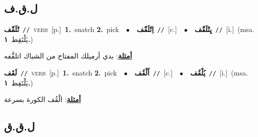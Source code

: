 \documentclass[10pt,a4paper,twoside]{article} %
\begin{document}
\begin{multicols}{2}
\vspace{-3mm}
\subsection*{\color{blue}\foreignlanguage{arabic}{ل.ق.ف}\color{blue}{}} 

{\setlength\topsep{0pt}\textbf{\foreignlanguage{arabic}{تْلَقّف}}\ {\color{gray}\texttt{//}\color{black}}\ \textsc{verb}\ [p.]\ \textbf{1.}~snatch  \textbf{2.}~pick\ \ $\bullet$\ \ \setlength\topsep{0pt}\textbf{\foreignlanguage{arabic}{اِتْلَقّف}}\ {\color{gray}\texttt{//}\color{black}}\ [c.]\ \ $\bullet$\ \ \setlength\topsep{0pt}\textbf{\foreignlanguage{arabic}{يِتْلَقّف}}\ {\color{gray}\texttt{//}\color{black}}\ [i.]\ \color{gray}(msa. \foreignlanguage{arabic}{يَلْتَقِط}~\foreignlanguage{arabic}{\textbf{١.}})\color{black}\  \begin{flushright}\color{gray}\foreignlanguage{arabic}{\textbf{\underline{\foreignlanguage{arabic}{أمثلة}}}: بدي أرميلك المفتاح من الشباك اتلقَّفه}\end{flushright}\color{black}} \vspace{2mm}

{\setlength\topsep{0pt}\textbf{\foreignlanguage{arabic}{لَقَف}}\ {\color{gray}\texttt{//}\color{black}}\ \textsc{verb}\ [p.]\ \textbf{1.}~snatch  \textbf{2.}~pick\ \ $\bullet$\ \ \setlength\topsep{0pt}\textbf{\foreignlanguage{arabic}{اُلْقُف}}\ {\color{gray}\texttt{//}\color{black}}\ [c.]\ \ $\bullet$\ \ \setlength\topsep{0pt}\textbf{\foreignlanguage{arabic}{يُلْقُف}}\ {\color{gray}\texttt{//}\color{black}}\ [i.]\ \color{gray}(msa. \foreignlanguage{arabic}{يَلْتَقِط}~\foreignlanguage{arabic}{\textbf{١.}})\color{black}\  \begin{flushright}\color{gray}\foreignlanguage{arabic}{\textbf{\underline{\foreignlanguage{arabic}{أمثلة}}}: الْقُف الكورة بسرعة}\end{flushright}\color{black}} \vspace{2mm}

\vspace{-3mm}
\subsection*{\color{blue}\foreignlanguage{arabic}{ل.ق.ق}\color{blue}{}} 


\end{multicols}
\end{document}
